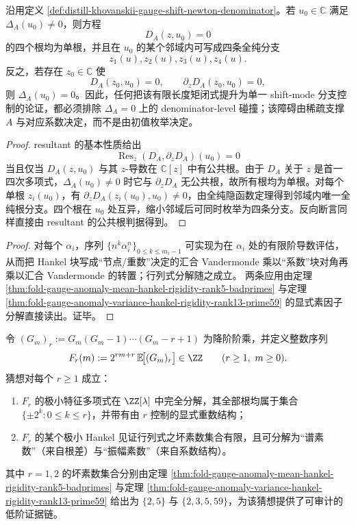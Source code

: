 \begin{proposition}\label{prop:distill-khovanskii-gauge-moment-sparse-resultant-obstruction}
沿用定义 \ref{def:distill-khovanskii-gauge-shift-newton-denominator}。若 \(u_0\in\mathbb C\) 满足 \(\Delta_A(u_0)\ne0\)，则方程
\[
D_A(z,u_0)=0
\]
的四个根均为单根，并且在 \(u_0\) 的某个邻域内可写成四条全纯分支
\[
z_1(u),z_2(u),z_3(u),z_4(u).
\]
反之，若存在 \(z_0\in\mathbb C\) 使
\[
D_A(z_0,u_0)=0,\qquad \partial_zD_A(z_0,u_0)=0,
\]
则 \(\Delta_A(u_0)=0\)。因此，任何把该有限长度矩闭式提升为单一 shift-mode 分支控制的论证，都必须排除 \(\Delta_A=0\) 上的 denominator-level 碰撞；该障碍由稀疏支撑 \(A\) 与对应系数决定，而不是由初值枚举决定。
\end{proposition}
\begin{proof}
resultant 的基本性质给出
\[
\operatorname{Res}_z(D_A,\partial_zD_A)(u_0)=0
\]
当且仅当 \(D_A(z,u_0)\) 与其 \(z\)-导数在 \(\mathbb C[z]\) 中有公共根。由于 \(D_A\) 关于 \(z\) 是首一四次多项式，\(\Delta_A(u_0)\ne0\) 时它与 \(\partial_zD_A\) 无公共根，故所有根均为单根。对每个单根 \(z_i(u_0)\)，有 \(\partial_zD_A(z_i(u_0),u_0)\ne0\)，由全纯隐函数定理得到邻域内唯一全纯根分支。四个根在 \(u_0\) 处互异，缩小邻域后可同时枚举为四条分支。反向断言同样直接由 resultant 的公共根判据得到。
\end{proof}

\begin{proof}
对每个 \(\alpha_i\)，序列 \(\{n^k\alpha_i^n\}_{0\le k\le m_i-1}\) 可实现为在 \(\alpha_i\) 处的有限阶导数评估，从而把 Hankel 块写成“节点/重数”决定的汇合 Vandermonde 乘以“系数”块对角再乘以汇合 Vandermonde 的转置；行列式分解随之成立。
两条应用由定理 \ref{thm:fold-gauge-anomaly-mean-hankel-rigidity-rank5-badprimes} 与定理 \ref{thm:fold-gauge-anomaly-variance-hankel-rigidity-rank13-prime59} 的显式素因子分解直接读出。证毕。
\end{proof}

\begin{conjecture}[高阶阶乘矩的二进模态普适性]\label{conj:fold-gauge-anomaly-factorial-moment-binary-modal-universality}
令 \((G_m)_r:=G_m(G_m-1)\cdots(G_m-r+1)\) 为降阶阶乘，并定义整数序列
\[
F_r(m):=2^{rm+r}\,\mathbb E\!\bigl[(G_m)_r\bigr]\in\ZZ\qquad(r\ge 1,\ m\ge 0).
\]
猜想对每个 \(r\ge 1\) 成立：
\begin{enumerate}
  \item \(F_r\) 的极小特征多项式在 \(\ZZ[\lambda]\) 中完全分解，其全部根均属于集合 \(\{\pm 2^{k}:0\le k\le r\}\)，并带有由 \(r\) 控制的显式重数结构；
  \item \(F_r\) 的某个极小 Hankel 见证行列式之坏素数集合有限，且可分解为“谱素数”（来自根差）与“振幅素数”（来自系数结构）。
\end{enumerate}
其中 \(r=1,2\) 的坏素数集合分别由定理 \ref{thm:fold-gauge-anomaly-mean-hankel-rigidity-rank5-badprimes} 与定理 \ref{thm:fold-gauge-anomaly-variance-hankel-rigidity-rank13-prime59} 给出为 \(\{2,5\}\) 与 \(\{2,3,5,59\}\)，为该猜想提供了可审计的低阶证据链。
\end{conjecture}
